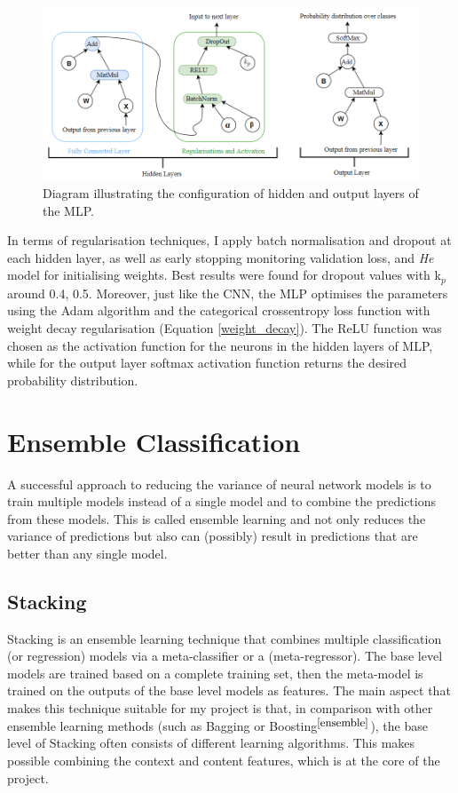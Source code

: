 \begin{figure}[H]
  \centering
  \centerline{\includegraphics[scale=0.5]{Images/mlp_layers.png}}
  \caption{Diagram illustrating the configuration of hidden and output layers of the MLP.}
  \label{mlp_layers}
\end{figure}

In terms of regularisation techniques, I apply batch normalisation and dropout at each hidden layer, as well as early stopping monitoring validation loss, and \textit{He} model for initialising weights. Best results were found for dropout values with k$_p$ around 0.4, 0.5. Moreover, just like the CNN, the MLP optimises the parameters using the Adam algorithm and the categorical crossentropy loss function with weight decay regularisation (Equation \ref{weight_decay}). The ReLU function was chosen as the activation function for the neurons in the hidden layers of MLP, while for the output layer softmax activation function returns the desired probability distribution. 


\section{Ensemble Classification}

A successful approach to reducing the variance of neural network models is to train multiple models instead of a single model and to combine the predictions from these models. This is called ensemble learning and not only reduces the variance of predictions but also can (possibly) result in predictions that are better than any single model. \\

\subsection{Stacking}

Stacking is an ensemble learning technique that combines multiple classification (or regression) models via a meta-classifier or a (meta-regressor). The base level models are trained based on a complete training set, then the meta-model is trained on the outputs of the base level models as features. The main aspect that makes this technique suitable for my project is that, in comparison with other ensemble learning methods (such as Bagging or Boosting$^{\small \cite{ensemble}}$), the base level of Stacking often consists of different learning algorithms. This makes possible combining the context and content features, which is at the core of the project.\\

